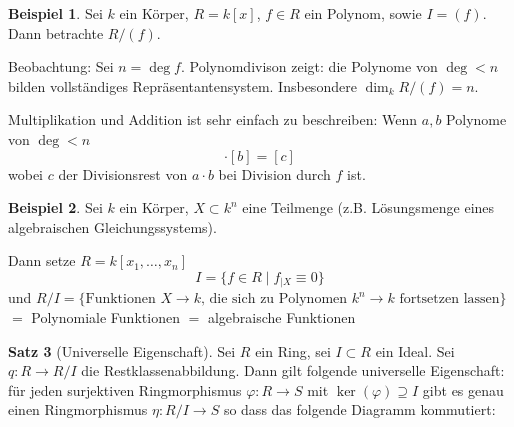 \documentclass[12pt,parskip=full]{scrartcl}
\theoremstyle{definition}
\newtheorem{theorem}{Satz}[section]
\newtheorem{example}[theorem]{Beispiel}
\theoremstyle{remark}
\begin{document}
	\begin{example}
		Sei $k$ ein Körper, $R = k[x]$, $f \in R$ ein Polynom, sowie $I = (f)$. Dann betrachte $R/(f)$.
		
		Beobachtung: Sei $n = \deg f$. Polynomdivison zeigt: die Polynome von $\deg < n$ bilden vollständiges Repräsentantensystem. Insbesondere $\dim_k R/(f) = n$.
		
		Multiplikation und Addition ist sehr einfach zu beschreiben: Wenn $a,b$ Polynome von $\deg < n$
		\begin{equation*}
			[a] \cdot [b] = [c]
		\end{equation*}
		wobei $c$ der Divisionsrest von $a \cdot b$ bei Division durch $f$ ist.
	\end{example}

	\begin{example}
		Sei $k$ ein Körper, $X \subset k^n$ eine Teilmenge (z.B. Lösungsmenge eines algebraischen Gleichungssystems).
		
		Dann setze $R = k[x_1, \dots, x_n]$
		\begin{equation*}
			I = \{ f \in R \mid f_{\mid X} \equiv 0 \}
		\end{equation*}
		und $R/I = \{ \text{Funktionen $X \to k$, die sich zu Polynomen $k^n \to k$ fortsetzen lassen} \}$ $=$ Polynomiale Funktionen $=$ algebraische Funktionen
	\end{example}

	\begin{theorem}[Universelle Eigenschaft]
		Sei $R$ ein Ring, sei $I \subset R$ ein Ideal. Sei $q: R \to R/I$ die Restklassenabbildung. Dann gilt folgende universelle Eigenschaft: für jeden surjektiven Ringmorphismus $\varphi: R \to S$ mit $\ker(\varphi) \supseteq I$ gibt es genau einen Ringmorphismus $\eta: R/I \to S$ so dass das folgende Diagramm kommutiert:
		
		\begin{center}
		\end{center}
	\end{theorem}
\end{document}

